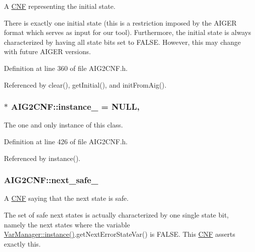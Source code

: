 A \hyperlink{classCNF}{C\-N\-F} representing the initial state. 

There is exactly one initial state (this is a restriction imposed by the A\-I\-G\-E\-R format which serves as input for our tool). Furthermore, the initial state is always characterized by having all state bits set to F\-A\-L\-S\-E. However, this may change with future A\-I\-G\-E\-R versions. 

Definition at line 360 of file A\-I\-G2\-C\-N\-F.\-h.



Referenced by clear(), get\-Initial(), and init\-From\-Aig().

\hypertarget{classAIG2CNF_ae298ae4804c63f5bac4dfab7528d35ad}{
\subsubsection[{instance\-\_\-}]{ $\ast$ A\-I\-G2\-C\-N\-F\-::instance\-\_\- = N\-U\-L\-L\hspace{0.3cm}{\ttfamily [static]}, {\ttfamily [private]}}}\label{classAIG2CNF_ae298ae4804c63f5bac4dfab7528d35ad}


The one and only instance of this class. 



Definition at line 426 of file A\-I\-G2\-C\-N\-F.\-h.



Referenced by instance().

\hypertarget{classAIG2CNF_a057c6a3159253267c99f115b7d724ee2}{
\subsubsection[{next\-\_\-safe\-\_\-}]{ A\-I\-G2\-C\-N\-F\-::next\-\_\-safe\-\_\-\hspace{0.3cm}{\ttfamily [protected]}}}\label{classAIG2CNF_a057c6a3159253267c99f115b7d724ee2}


A \hyperlink{classCNF}{C\-N\-F} saying that the next state is safe. 

The set of safe next states is actually characterized by one single state bit, namely the next states where the variable \hyperlink{classVarManager_ac1a84b367c26dfc5ee9e612f7d61b288}{Var\-Manager\-::instance()}.get\-Next\-Error\-State\-Var() is F\-A\-L\-S\-E. This \hyperlink{classCNF}{C\-N\-F} asserts exactly this. 

